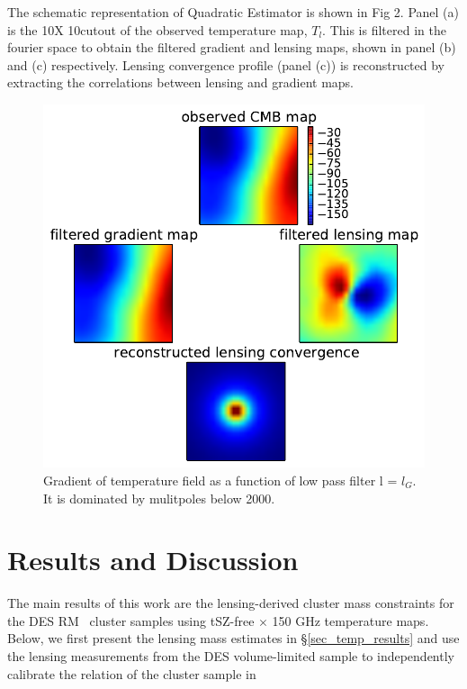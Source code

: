  
The schematic representation of Quadratic Estimator is shown in Fig 2. 
Panel (a) is the 10\arcmin X 10\arcmin cutout of the observed temperature map, $T_{l}$.
This is filtered in the fourier space  to obtain the filtered gradient and lensing maps, shown in panel (b) and (c) respectively.
Lensing convergence profile (panel (c)) is reconstructed by extracting the correlations between lensing and gradient maps.
 \begin{figure}[H]
\includegraphics[width=\linewidth]{figs/schematic_rep.pdf}
\caption{Gradient of temperature field as a function of low pass filter l = $l_{G}$. It is dominated by mulitpoles below 2000. }
\label{fig:gradient_cut}
\end{figure}
  \section{Results and Discussion}\label{sec_results}

The main results of this work are the lensing-derived cluster mass constraints for the DES RM \whichyear\ cluster samples using \sptpol{} tSZ-free $\times$ 150 GHz temperature maps.
Below, we first present the lensing mass estimates in \S\ref{sec_temp_results} and use the lensing measurements from the DES \whichyear{} volume-limited sample to independently calibrate the \ML{} relation of the cluster sample in %
